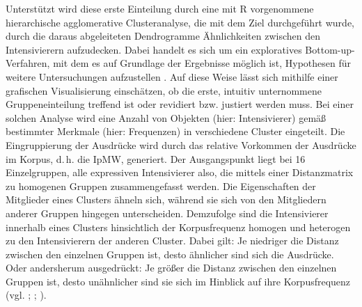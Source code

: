 Unterstützt wird diese erste Einteilung durch eine mit R vorgenommene hierarchische agglomerative Clusteranalyse, die mit dem Ziel durchgeführt wurde, durch die daraus abgeleiteten Dendrogramme Ähnlichkeiten zwischen den Intensivierern aufzudecken. Dabei handelt es sich um ein exploratives Bottom-up-Verfahren, mit dem es auf Grundlage der Ergebnisse möglich ist, Hypothesen für weitere Untersuchungen aufzustellen \citep[vgl.][294]{Gries.2008}. Auf diese Weise lässt sich mithilfe einer grafischen Visualisierung einschätzen, ob die erste, intuitiv unternommene Gruppeneinteilung treffend ist oder revidiert bzw. \mbox{justiert} werden muss. Bei einer solchen Analyse wird eine Anzahl von Objekten (hier: Intensivierer) gemäß bestimmter Merkmale (hier: Frequenzen) in verschiedene Cluster eingeteilt. Die Eingruppierung der Ausdrücke wird durch das relative Vorkommen der Ausdrücke im Korpus, d.\,h. die IpMW, generiert. Der Ausgangspunkt liegt bei 16 Einzelgruppen, alle expressiven Intensivierer also, die mittels einer Distanzmatrix zu homogenen Gruppen zusammengefasst werden. Die Eigenschaften der Mitglieder eines Clusters ähneln sich, während sie sich von den Mitgliedern anderer Gruppen hingegen unterscheiden. Demzufolge sind die Intensivierer innerhalb eines Clusters hinsichtlich der Korpusfrequenz homogen und heterogen zu den Intensivierern der anderen Cluster. Dabei gilt: Je niedriger die Distanz zwischen den einzelnen Gruppen ist, desto ähnlicher sind sich die Ausdrücke. Oder andersherum ausgedrückt: Je größer die Distanz zwischen den einzelnen Gruppen ist, desto unähnlicher sind sie sich im Hinblick auf ihre Korpusfrequenz (vgl. \mbox{\citealt[296]{Gries.2008}}; \mbox{\citealt[440]{Backhaus.2018}}; \mbox{\citealt[437ff.]{Sauer.2019}}).


